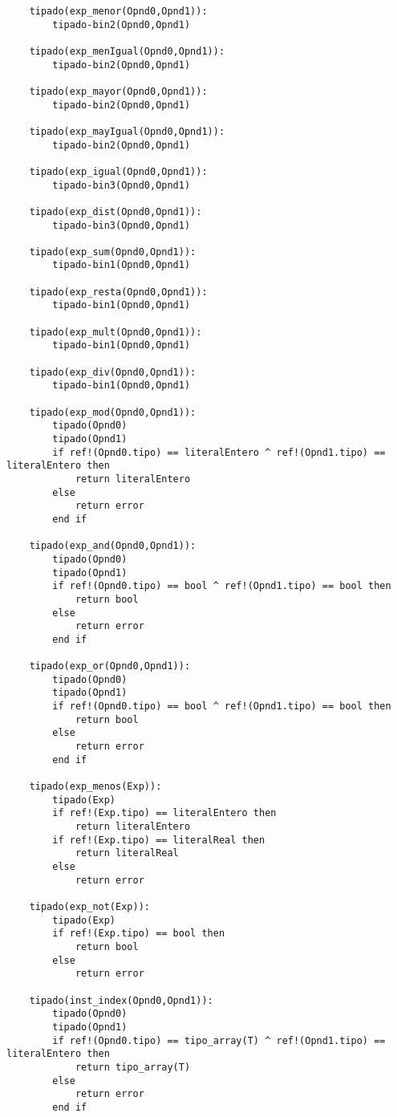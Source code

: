 \begin{lstlisting}
    tipado(exp_menor(Opnd0,Opnd1)):
        tipado-bin2(Opnd0,Opnd1)

    tipado(exp_menIgual(Opnd0,Opnd1)):
        tipado-bin2(Opnd0,Opnd1)

    tipado(exp_mayor(Opnd0,Opnd1)):
        tipado-bin2(Opnd0,Opnd1)

    tipado(exp_mayIgual(Opnd0,Opnd1)):
        tipado-bin2(Opnd0,Opnd1)

    tipado(exp_igual(Opnd0,Opnd1)):
        tipado-bin3(Opnd0,Opnd1)

    tipado(exp_dist(Opnd0,Opnd1)):
        tipado-bin3(Opnd0,Opnd1)

    tipado(exp_sum(Opnd0,Opnd1)):
        tipado-bin1(Opnd0,Opnd1)

    tipado(exp_resta(Opnd0,Opnd1)):
        tipado-bin1(Opnd0,Opnd1)

    tipado(exp_mult(Opnd0,Opnd1)):
        tipado-bin1(Opnd0,Opnd1)

    tipado(exp_div(Opnd0,Opnd1)):
        tipado-bin1(Opnd0,Opnd1)

    tipado(exp_mod(Opnd0,Opnd1)):
        tipado(Opnd0)
        tipado(Opnd1)
        if ref!(Opnd0.tipo) == literalEntero ^ ref!(Opnd1.tipo) == literalEntero then
            return literalEntero
        else 
            return error
        end if

    tipado(exp_and(Opnd0,Opnd1)):
        tipado(Opnd0)
        tipado(Opnd1)
        if ref!(Opnd0.tipo) == bool ^ ref!(Opnd1.tipo) == bool then
            return bool
        else 
            return error
        end if

    tipado(exp_or(Opnd0,Opnd1)):
        tipado(Opnd0)
        tipado(Opnd1)
        if ref!(Opnd0.tipo) == bool ^ ref!(Opnd1.tipo) == bool then
            return bool
        else 
            return error
        end if

    tipado(exp_menos(Exp)):
        tipado(Exp)
        if ref!(Exp.tipo) == literalEntero then
            return literalEntero
        if ref!(Exp.tipo) == literalReal then
            return literalReal
        else 
            return error

    tipado(exp_not(Exp)):
        tipado(Exp)
        if ref!(Exp.tipo) == bool then
            return bool
        else 
            return error

    tipado(inst_index(Opnd0,Opnd1)):
        tipado(Opnd0)
        tipado(Opnd1)
        if ref!(Opnd0.tipo) == tipo_array(T) ^ ref!(Opnd1.tipo) == literalEntero then
            return tipo_array(T)
        else 
            return error
        end if


\end{lstlisting}
